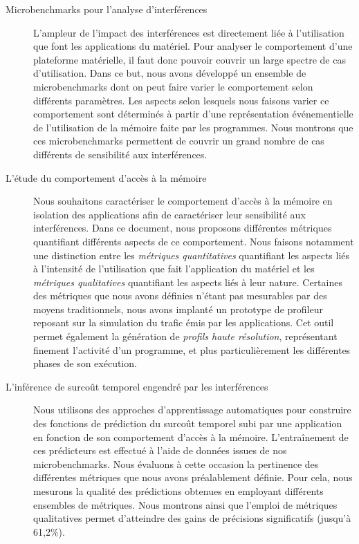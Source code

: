 \begin{description}
	\item [Microbenchmarks pour l'analyse d'interférences] L'ampleur de l'impact des interférences est directement liée à l'utilisation que font les applications du matériel.
	Pour analyser le comportement d'une plateforme matérielle, il faut donc pouvoir couvrir un large spectre de cas d'utilisation.
	Dans ce but, nous avons développé un ensemble de microbenchmarks dont on peut faire varier le comportement selon différents paramètres.
	Les aspects selon lesquels nous faisons varier ce comportement sont déterminés à partir d'une représentation événementielle de l'utilisation de la mémoire faite par les programmes.
	Nous montrons que ces microbenchmarks permettent de couvrir un grand nombre de cas différents de sensibilité aux interférences.

	\item [L'étude du comportement d'accès à la mémoire] Nous souhaitons caractériser le comportement d'accès à la mémoire en isolation des applications afin de caractériser leur sensibilité aux interférences.
	Dans ce document, nous proposons différentes métriques quantifiant différents aspects de ce comportement.
	Nous faisons notamment une distinction entre les \emph{métriques quantitatives} quantifiant les aspects liés à l'intensité de l'utilisation que fait l'application du matériel et les \emph{métriques qualitatives} quantifiant les aspects liés à leur nature.
	Certaines des métriques que nous avons définies n'étant pas mesurables par des moyens traditionnels, nous avons implanté un prototype de profileur reposant sur la simulation du trafic émis par les applications.
	Cet outil permet également la génération de \emph{profils haute résolution}, représentant finement l'activité d'un programme, et plus particulièrement les différentes phases de son exécution.

	\item [L'inférence de surcoût temporel engendré par les interférences] Nous utilisons des approches d'apprentissage automatiques pour construire des fonctions de prédiction du surcoût temporel subi par une application en fonction de son comportement d'accès à la mémoire.
	L'entraînement de ces prédicteurs est effectué à l'aide de données issues de nos microbenchmarks.
	Nous évaluons à cette occasion la pertinence des différentes métriques que nous avons préalablement définie.
	Pour cela, nous mesurons la qualité des prédictions obtenues en employant différents ensembles de métriques.
	Nous montrons ainsi que l'emploi de métriques qualitatives permet d'atteindre des gains de précisions significatifs (jusqu'à 61,2\%).
\end{description}

